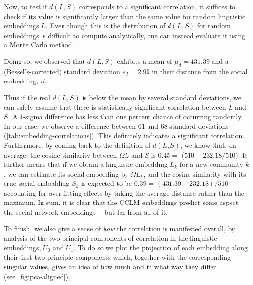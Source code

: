 \documentclass[11pt]{article}
\begin{document}
Now, to test if \(d(L,S)\) corresponds to a significant correlation,
it suffices to check if its value is significantly larger than the same
value for random linguistic embeddings \(L\). Even though this is the
distribution of \(d(L,S)\) for random embeddings is difficult to
compute analytically, one can instead evaluate it using a Monte Carlo
method.

Doing so, we observed that \(d(L,S)\) exhibits a mean of
\(μ_d=431.39\) and a (Bessel's-corrected) standard deviation
\(s_d=2.90\) in their distance from the social embedding,
\(S\). %


Thus if the real \(d(L,S)\) is below the mean by several standard
deviations, we can safely assume that there is statistically
significant correlation between \(L\) and \(S\). A 4-sigma difference
has less than one percent chance of occurring randomly. In our case:
we observe a difference between 61 and 68 standard deviations
(\cref{tab:embedding-correlations}). This definitely indicates a
significant correlation.  Furthermore, by coming back to the
definition of \(d(L,S)\), we know that, on average, the cosine
similarity between \(ΩL\) and \(S\) is \(0.45 = \) (\(510 - 232.18 / 510\)).  It
further means that if we obtain a linguistic embedding \(L_k\) for a
new community $k$, we can estimate its social embedding by \(ΩL_k\),
and the cosine similarity with its true social embedding \(S_k\) is
expected to be \(0.39\) = \((431.39 - 232.18) / 510\) --- accounting for
over-fitting effects by taking the average distance rather than the
maximum. %
In sum, it is clear that the CCLM embeddings predict some aspect the social-network embeddings--- but far from all of it.

To finish, we also give a sense of \emph{how} the correlation is manifested overall, by
analysis of the two principal components of correlation in the
linguistic embeddings, \(U_0\) and \(U_1\). To do so we plot the
projection of each embedding along their first two principle components
which, together with the corresponding singular values, gives an idea
of how much and in what way they differ (see~\cref{fig:pca-aligned}).


\begin{figure*}[t]
    \centering
    \PCAAligned 
  \caption{First two components of the aligned social (left) and linguistic (right) embeddings,
    where the lingusitic embedding is taken from the LTSM with $l_c=1$.
    Correlation between these directions is given by $\sigma_0 = 53.4$ and $\sigma_1 = 35.6$.
    Colors are assigned by k-means clustering of the social embedding. 
    This figure is reproduced in the supplementary materials with a legend that helps 
    to characterise the clusters.
  }
  \label{fig:pca-aligned}
\end{figure*}
\end{document}
